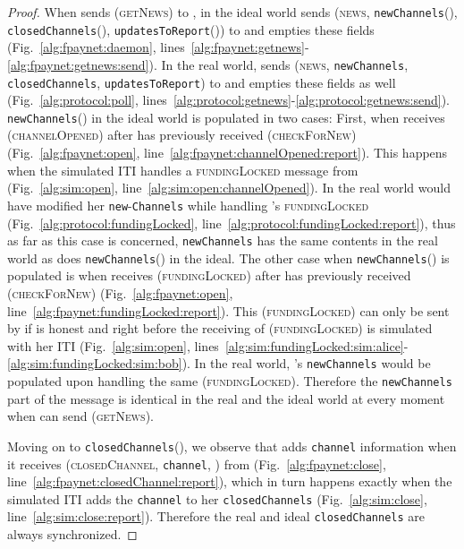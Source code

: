 \begin{proof}
  When \environment{} sends (\textsc{getNews}) to \alice, in the ideal world
  \fpaynet{} sends (\textsc{news}, \texttt{newChannels}(\alice),
  \texttt{closedChannels}(\alice), \texttt{updatesToReport}\linebreak(\alice))
  to \environment{} and empties these fields (Fig.~\ref{alg:fpaynet:daemon},
  lines~\ref{alg:fpaynet:getnews}-\ref{alg:fpaynet:getnews:send}). In the real
  world, \alice{} sends (\textsc{news}, \texttt{newChannels},
  \texttt{closedChannels}, \texttt{updatesToReport}) to \environment{} and
  empties these fields as well (Fig.~\ref{alg:protocol:poll},
  lines~\ref{alg:protocol:getnews}-\ref{alg:protocol:getnews:send}).
  \texttt{newChannels}(\alice) in the ideal world is populated in two cases:
  First, when \fpaynet{} receives (\textsc{channelOpened}) after \alice{} has
  previously received (\textsc{checkForNew}) (Fig.~\ref{alg:fpaynet:open},
  line~\ref{alg:fpaynet:channelOpened:report}). This happens when the simulated
  \alice{} ITI handles a \textsc{fundingLocked} message from \bob{}
  (Fig.~\ref{alg:sim:open}, line~\ref{alg:sim:open:channelOpened}). In the real
  world \alice{} would have modified her
  \texttt{new}-\linebreak\texttt{Channels} while handling \bob's
  \textsc{fundingLocked} (Fig.~\ref{alg:protocol:fundingLocked},
  line~\ref{alg:protocol:fundingLocked:report}), thus as far as this case is
  concerned, \texttt{newChannels} has the same contents in the real world as
  does \texttt{newChannels}(\alice) in the ideal. The other case when
  \texttt{newChannels}(\alice) is populated is when \fpaynet{} receives
  (\textsc{fundingLocked}) after \bob{} has previously received
  (\textsc{checkForNew}) (Fig.~\ref{alg:fpaynet:open},
  line~\ref{alg:fpaynet:fundingLocked:report}). This (\textsc{fundingLocked})
  can only be sent by \simulator{} if \alice{} is honest and right before the
  receiving of (\textsc{fundingLocked}) is simulated with her ITI
  (Fig.~\ref{alg:sim:open},
  lines~\ref{alg:sim:fundingLocked:sim:alice}-\ref{alg:sim:fundingLocked:sim:bob}).
  In the real world, \alice's \texttt{newChannels} would be populated upon
  handling the same (\textsc{fundingLocked}). Therefore the \texttt{newChannels}
  part of the message is identical in the real and the ideal world at every
  moment when \environment{} can send (\textsc{getNews}).

  Moving on to \texttt{closedChannels}(\alice), we observe that \fpaynet{} adds
  \texttt{channel} information when it receives (\textsc{closedChannel},
  \texttt{channel}, \alice) from \simulator{} (Fig.~\ref{alg:fpaynet:close},
  line~\ref{alg:fpaynet:closedChannel:report}), which in turn happens exactly
  when the simulated \alice{} ITI adds the \texttt{channel} to her
  \texttt{closedChannels} (Fig.~\ref{alg:sim:close},
  line~\ref{alg:sim:close:report}). Therefore the real and ideal
  \texttt{closedChannels} are always synchronized.


\end{proof}
